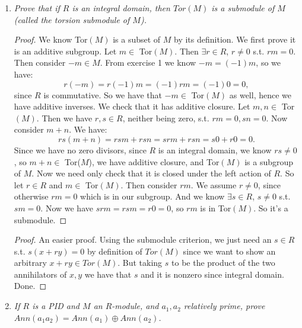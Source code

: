 \documentclass[9pt,reqno,twoside]{amsbook}
\theoremstyle{plain}
\numberwithin{section}{chapter}
\numberwithin{equation}{chapter}
\theoremstyle{definition}
\theoremstyle{remark}
\theoremstyle{plain}
\begin{document}
\begin{enumerate}[label=\arabic*.]
\item \textit{Prove that if $R$ is an integral domain, then $Tor(M)$ is a submodule of $M$ (called the torsion submodule of $M$). }
\begin{proof}
We know Tor$(M)$ is a subset of $M$ by its definition. We first prove it is an additive subgroup. Let $m \in $ Tor$(M)$. Then $\exists r \in R$, $r \neq 0$ s.t. $rm = 0$. Then consider $-m \in M$. From exercise 1 we know 
$
-m = (-1)m$, so we have:
$$
r(-m) = r(-1)m = (-1)rm = (-1)0 = 0,
$$
 since $R$ is commutative. So we have that $-m \in $ Tor$(M)$ as well, hence we have additive inverses. We check that it has additive closure. Let $m,n \in $ Tor$(M)$. Then we have $r,s \in R$, neither being zero, s.t. $rm = 0, sn = 0$. Now consider $m + n$. We have:
$$
rs(m + n) = rsm + rsn = srm + rsn = s0 + r0 = 0.
$$
Since we have no zero divisors, since $R$ is an integral domain, we know $rs \neq 0$, so $m  +n \in $ Tor($M$), we have additive closure, and Tor$(M)$ is a subgroup of $M$. Now we need only check that it is closed under the left action of $R$. So let $r \in R$ and $m \in $ Tor$(M)$. Then consider $rm$. We assume $r \neq 0$, since otherwise $rm = 0$ which is in our subgroup. And we know $\exists s \in R$, $s \neq 0$ s.t. $sm = 0$. Now we have $srm = rsm = r0 = 0$, so $rm$ is in Tor$(M)$. So it's a submodule. 
\end{proof}

\begin{proof}
An easier proof. Using the submodule criterion, we just need an $s \in R$ s.t. $s(x + ry) = 0$ by definition of $Tor(M)$ since we want to show an arbitrary $x  +ry \in Tor(M)$. But taking $s$ to be the product of the two annihilators of $x,y$ we have that $s$ and it is nonzero since integral domain. Done. 
\end{proof}

\item \textit{If $R$ is a PID and $M$ an $R$-module, and $a_1,a_2$ relatively prime, prove $Ann(a_1a_2) = Ann(a_1) \oplus Ann(a_2)$. }


\end{enumerate}
\end{document}
